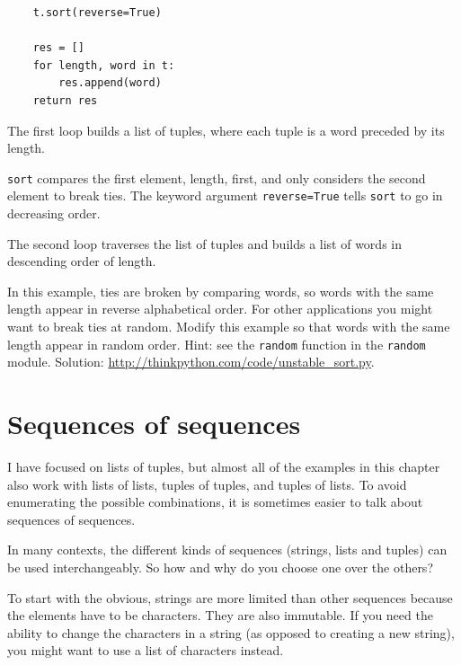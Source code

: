 \documentclass[10pt]{book}
\begin{document}
\begin{CJK}{UTF8}{gbsn}
\begin{verbatim}
    t.sort(reverse=True)

    res = []
    for length, word in t:
        res.append(word)
    return res
\end{verbatim}
%
The first loop builds a list of tuples, where each
tuple is a word preceded by its length.

{\tt sort} compares the first element, length, first, and
only considers the second element to break ties.  The keyword argument
{\tt reverse=True} tells {\tt sort} to go in decreasing order.

The second loop traverses the list of tuples and builds a list of
words in descending order of length.

\begin{exercise}

In this example, ties are broken by comparing words, so words
with the same length appear in reverse alphabetical order.  For other
applications you might want to break ties at random.  Modify
this example so that words with the same length appear in
random order.  Hint: see the {\tt random} function in the
{\tt random} module.
Solution: \url{http://thinkpython.com/code/unstable_sort.py}.


\end{exercise}


\section{Sequences of sequences}

I have focused on lists of tuples, but almost all of the examples in
this chapter also work with lists of lists, tuples of tuples, and
tuples of lists.  To avoid enumerating the possible combinations, it
is sometimes easier to talk about sequences of sequences.

In many contexts, the different kinds of sequences (strings, lists and
tuples) can be used interchangeably.  So how and why do you choose one
over the others?

To start with the obvious, strings are more limited than other
sequences because the elements have to be characters.  They are
also immutable.  If you need the ability to change the characters
in a string (as opposed to creating a new string), you might
want to use a list of characters instead.


\end{CJK}
\end{document}
